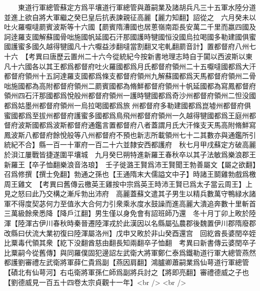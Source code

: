 　　東道行軍總管蘇定方爲平壤道行軍總管與蕭嗣業及諸胡兵凡三十五軍水陸分道並進上欲自將大軍繼之癸巳皇后抗表諫親征高麗【麗力知翻】詔從之　六月癸未以吐火羅嚈噠罽賓波斯等十六國【罽賓隋漕國也居蔥嶺南距長安萬二千里而嬴四國及訶逹羅支國解蘇國骨咄施國帆延國石汗那國護時犍國恒没國烏拉喝國多勒建國俱蜜國護蜜多國久越得犍國凡十六嚈益涉翻噠當割翻又宅軋翻罽音計】置都督府八州七十六　【考異曰唐歷云置州二十六今從統紀今按新書地理志時自于闐以西波斯以東凡十六國各以其王都爲都督府吐火羅國都爲月氏都督府領州二十五嚈噠國都爲大汗都督府領州十五訶達羅支國都爲條支都督府領州九解蘇國都爲天馬都督府領州二骨咄施國都為高附都督府領州二罽賓國都為脩鮮都督府領州十帆延國都為寫鳳都督府領州四石汗那國都爲悅般州都督府領州一護時犍國都爲奇沙州都督府領州二怛没國都爲姑墨州都督府領州一烏拉喝國都爲旅州都督府多勒建國都爲崑墟州都督府俱蜜國都爲至拔州都督府護蜜多國都爲鳥飛州都督府領州一久越得犍國都爲王庭州都督府波斯國都爲波斯都督府通鑑言置都督府八者蓋謂月氏大汗條支天馬高附脩鮮寫鳳波斯八都督府餘悅般等八州都督府不預也新志所載領州七十二其數亦與通鑑所引統紀不合】縣一百一十軍府一百二十六並隸安西都護府　秋七月甲戌蘇定方破高麗於浿江屢戰皆捷遂圍平壤城　九月癸巳朔特進新羅王春秋卒以其子法敏爲樂浪郡王新羅王【卒子恤翻樂浪音洛琅】　壬子徙潞王賢爲沛王賢聞王勃善屬文【屬之欲翻】召爲修撰【撰士免翻】勃通之孫也【王通隋末大儒謚文中子】時諸王鬬雞勃戲爲檄周王雞文　【考異曰舊傳云檄英王雞按中宗爲英王時沛王賢已爲太子當云周王】上見之怒曰此乃交構之漸斥勃出沛府　高麗蓋蘇文遣其子男生以精兵數萬守鴨緑水諸軍不得度契苾何力至值氷大合何力引衆乘氷度水鼓譟而進高麗大潰追奔數十里斬首三萬級餘衆悉降【降戶江翻】男生僅以身免會有詔班師乃還　冬十月丁卯上畋於陸渾【陸渾古伊川春秋時秦晉遷陸渾戎於此漢因以名縣屬弘農郡後魏置伊川郡隋廢郡改縣曰伏流大業初復曰陸渾屬洛州】戊申又畋於非山癸酉還宫　回紇酋長婆閏卒姪比粟毒代領其衆【紇下没翻酋慈由翻長知兩翻卒子恤翻　考異曰新書傳云婆閏卒子比粟嗣今從舊傳】與同羅僕固犯邊詔左武衛大將軍鄭仁泰爲鐵勒道行軍大總管燕然都護劉審禮左武衛將軍薛仁貴爲副【燕因肩翻】鴻臚卿蕭嗣業爲仙萼道行軍總管【磧北有仙萼河】右屯衛將軍孫仁師爲副將兵討之【將即亮翻】審禮德威之子也【劉德威見一百五十四卷太宗貞觀十一年】<br />
<br />
